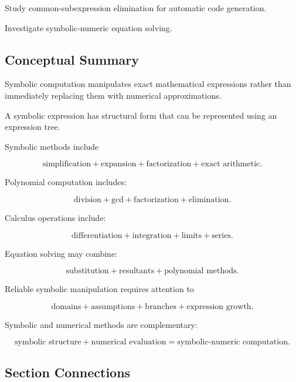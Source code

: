 \begin{exercise}[4]
Study common-subexpression elimination for automatic code generation.
\end{exercise}

\begin{exercise}[4]
Investigate symbolic-numeric equation solving.
\end{exercise}

\subsection{Conceptual Summary}
\label{subsec:symbolic-computation-summary}

Symbolic computation manipulates exact mathematical expressions rather
than immediately replacing them with numerical approximations.

A symbolic expression has structural form that can be represented using an
expression tree.

Symbolic methods include

\[
\boxed{
\text{simplification}
+
\text{expansion}
+
\text{factorization}
+
\text{exact arithmetic}.
}
\]

Polynomial computation includes:

\[
\boxed{
\text{division}
+
\text{gcd}
+
\text{factorization}
+
\text{elimination}.
}
\]

Calculus operations include:

\[
\boxed{
\text{differentiation}
+
\text{integration}
+
\text{limits}
+
\text{series}.
}
\]

Equation solving may combine:

\[
\boxed{
\text{substitution}
+
\text{resultants}
+
\text{polynomial methods}.
}
\]

Reliable symbolic manipulation requires attention to

\[
\boxed{
\text{domains}
+
\text{assumptions}
+
\text{branches}
+
\text{expression growth}.
}
\]

Symbolic and numerical methods are complementary:

\[
\boxed{
\text{symbolic structure}
+
\text{numerical evaluation}
=
\text{symbolic-numeric computation}.
}
\]

\subsection{Section Connections}
\label{subsec:symbolic-computation-connections}

